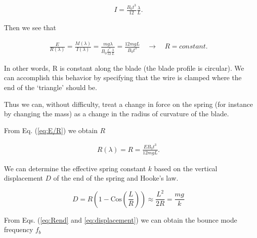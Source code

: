 \begin{eqnarray}
I = \frac{B_0t^3}{12} \frac{\lambda}{L}.
\label{eq:Itri}
\end{eqnarray}

Then we see that 

\begin{eqnarray}
\frac{E}{R(\lambda)} = \frac{M(\lambda)}{I(\lambda)} = 
\frac{m g \lambda}{B_0\frac{t^3}{12} \frac{\lambda}{L}} = 
\frac{12 m g L}{B_0 t^3} \quad \rightarrow \quad R=constant.
\label{eq:E/R}
\end{eqnarray}

In other words, R is constant along the blade (the blade profile is circular). We can accomplish this behavior by specifying that the wire is clamped where the end of the `triangle' should be.



Thus we can, without difficulty, treat a change in force on the spring (for instance by changing the mass) as a change in the radius of curvature of the blade.


From Eq. (\ref{eq:E/R}) we obtain $R$

\begin{eqnarray}
R(\lambda) = R = \frac{E B_0 t^3}{12 m g L}.
\label{eq:Rend}
\end{eqnarray}

We can determine the effective spring constant $k$ based on the vertical displacement $D$ of the end of the spring and Hooke's law.

\begin{equation}
D = R (1-\mbox{Cos}(\frac{L}{R})) \approx \frac{L^2}{2 R} = \frac{mg}{k}
\label{eq:displacement} 
\end{equation}

From Eqs. (\ref{eq:Rend} and \ref{eq:displacement}) we can obtain the bounce mode frequency $f_b$


